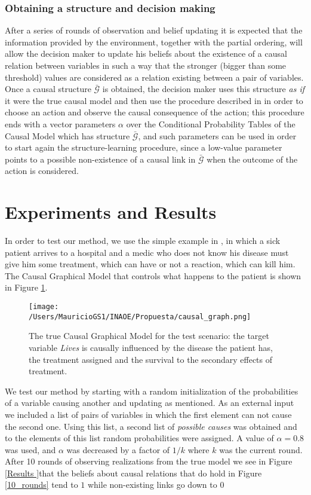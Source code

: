 \documentclass[letterpaper]{article}
\begin{document}
\subsubsection{Obtaining a structure and decision making}
After a series of rounds of observation and belief updating it is expected that the information provided by the environment, together with the partial ordering, will allow the decision maker to update his beliefs about the existence of a causal relation between variables in such a way that the stronger (bigger than some threshold) values are considered as a relation existing between a pair of variables. Once a causal structure $\bar{\mathcal{G}}$ is obtained, the decision maker uses this structure \textit{as if} it were the true causal model and then use the procedure described in \cite{gonzalez2018playing} in order to choose an action and observe the causal consequence of the action; this procedure ends with a vector parameters $\alpha$ over the Conditional Probability Tables of the Causal Model which has structure $\bar{\mathcal{G}}$, and such parameters can be used in order to start again the structure-learning procedure, since a low-value parameter points to a possible non-existence of a causal link in $\bar{\mathcal{G}}$ when the outcome of the action is considered.

\section{Experiments and Results}
In order to test our method, we use the simple example in \cite{gonzalez2018playing}, in which a sick patient arrives to a hospital and a medic who does not know his disease must give him some treatment, which can have or not a reaction, which can kill him. The Causal Graphical Model that controls what happens to the patient is shown in Figure \ref{causal_model}.

\begin{figure}[ht]
\vskip 0.2in
\begin{center}
\centerline{\texttt{[image: /Users/MauricioGS1/INAOE/Propuesta/causal\_graph.png]}}
\caption{The true Causal Graphical Model for the test scenario: the target variable \textit{Lives} is causally influenced by the disease the patient has, the treatment assigned and the survival to the secondary effects of treatment.}
\label{causal_model}
\end{center}
\vskip -0.2in
\end{figure}

We test our method by starting with a random initialization of the probabilities of a variable causing another and updating as mentioned. As an external input we included a list of pairs of variables in which the first element can not cause the second one. Using this list, a second list of \textit{possible causes} was obtained and to the elements of this list random probabilities were assigned. A value of $\alpha=0.8$ was used, and $\alpha$ was decreased by a factor of $1/k$ where $k$ was the current round. After 10 rounds of observing realizations from the true model we see in Figure \ref{Results }that the beliefs about causal relations that do hold in Figure \ref{10_rounds} tend to $1$ while non-existing links go down to $0$ 
\end{document}

